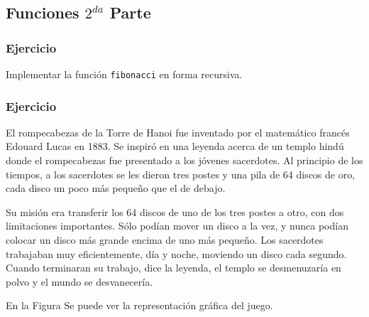 \begin{lstlisting}[style=customc, basicstyle=\ttfamily]
\end{lstlisting}

\subsubsection{}
\begin{lstlisting}[style=customc, basicstyle=\ttfamily]
\end{lstlisting}

\subsection*{Funciones $2^{da}$ Parte}

\subsubsection{Ejercicio}
Implementar la función \texttt{fibonacci} en forma recursiva.

\lstset{inputencoding=utf8/latin1}


\subsubsection{Ejercicio}
El rompecabezas de la Torre de Hanoi fue inventado por el matemático francés Edouard Lucas en 1883. Se inspiró en una leyenda acerca de un templo hindú donde el rompecabezas fue presentado a los jóvenes sacerdotes. Al principio de los tiempos, a los sacerdotes se les dieron tres postes y una pila de 64 discos de oro, cada disco un poco más pequeño que el de debajo. 

Su misión era transferir los 64 discos de uno de los tres postes a otro, con dos limitaciones importantes. Sólo podían mover un disco a la vez, y nunca podían colocar un disco más grande encima de uno más pequeño. Los sacerdotes trabajaban muy eficientemente, día y noche, moviendo un disco cada segundo. Cuando terminaran su trabajo, dice la leyenda, el templo se desmenuzaría en polvo y el mundo se desvanecería.

En la Figura  Se puede ver la representación gráfica del juego.

